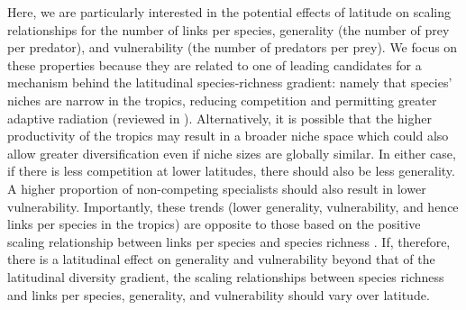 \documentclass[12pt]{article}
\begin{document}
Here, we are particularly interested in the potential effects of latitude on scaling relationships for the number of
links per species, generality (the number of prey per predator), and vulnerability (the number of predators per prey).
We focus on these properties because they are related to one of leading candidates for a mechanism behind the 
latitudinal species-richness gradient: namely that species' niches are narrow in the tropics, reducing competition
and permitting greater adaptive radiation (reviewed in \citet{Vazquez2004}). Alternatively, it is  possible that the
higher productivity of the tropics \citep{Brown2004} may result in a broader 
niche space \citep{Davies2007} which could also allow greater diversification even if niche sizes are globally similar.
In either case, if there is less competition at lower latitudes, there should also be less generality. A higher 
proportion of non-competing specialists should also result in lower vulnerability.
Importantly, these trends (lower generality, vulnerability, and hence links per species in the tropics) are opposite
to those based on the positive scaling relationship between links per species and species richness \citep{Riede2010}.
If, therefore, there is a latitudinal effect on generality and vulnerability beyond that of the latitudinal diversity
gradient, the scaling relationships between species richness and links per species, generality, and vulnerability 
should vary over latitude. 






\end{document}
